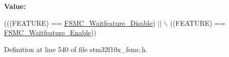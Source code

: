 {\bfseries Value\+:}
\begin{DoxyCode}
(((FEATURE) == \hyperlink{group___f_s_m_c___wait__feature_ga8a31f05576e66546fbbcdb06ff67da7d}{FSMC\_Waitfeature\_Disable}) || \(\backslash\)
                                       ((FEATURE) == \hyperlink{group___f_s_m_c___wait__feature_ga3113366130dfbf6d116f1afb94af1726}{FSMC\_Waitfeature\_Enable}))
\end{DoxyCode}


Definition at line 540 of file stm32f10x\+\_\+fsmc.\+h.

